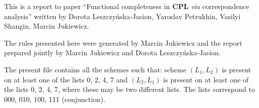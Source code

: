 \documentclass[11pt]{article}
\begin{document}
	
	This is a report to paper ``Functional completeness in \textbf{CPL} \textit{via} correspondence analysis'' written by Dorota Leszczy\'{n}ska-Jasion, 
	Yaroslav Petrukhin, Vasilyi Shangin, Marcin Jukiewicz. 
	
	The rules presented here were generated by Marcin Jukiewicz and the report prepared jointly by Marcin Jukiewicz and Dorota Leszczy\'{n}ska-Jasion.
	
	The present file contains all the schemes such that: scheme $(L_1, L_2)$ is present on at least one of the lists 0, 2, 4, 7 and $(L_2, L_1)$ is present on at least one of the lists 0, 2, 4, 7, where these may be two different lists. The lists correspond to 000, 010, 100, 111 (conjunction).
	
	\bigskip

\begin{center}


\end{center}
\end{document}
